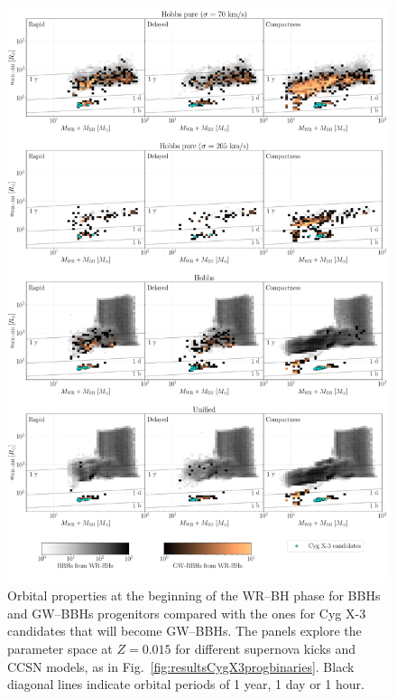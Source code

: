 \documentclass[a4paper,titlepage]{book}     	%
\begin{document}
\begin{figure}[h!]
	\centering
	\includegraphics[width=\textwidth]{./images/kickcompare_WRBH_015.pdf}	
	\caption{Orbital properties at the beginning of the WR--BH phase for BBHs and GW--BBHs progenitors compared with the ones for Cyg X-3 candidates that will become GW--BBHs. The panels explore the parameter space at $Z=0.015$ for different supernova kicks and CCSN models, as in Fig.\ \ref{fig:resultsCygX3progbinaries}. Black diagonal lines indicate orbital periods of 1 year, 1 day or 1 hour.}\label{fig:resultsCygX3WRBHbinaries}
\end{figure}
\end{document}
